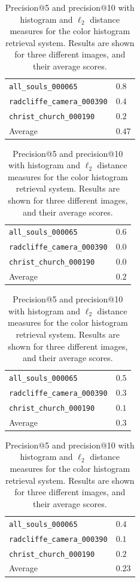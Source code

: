\documentclass[a4paper,10pt,twoside]{article}
\begin{document}
\begin{table}
  \begin{subtable}{0.47\textwidth}
    \begin{tabular}{l|l}
      \texttt{all\_souls\_000065} & $0.8$ \\
      \texttt{radcliffe\_camera\_000390} & $0.4$ \\
      \texttt{christ\_church\_000190} & $0.2$ \\
      \hline
      Average                     & $0.47$ \\
    \end{tabular}
    \caption{Precision@5, histogram distance.}
    \label{tab:color_p5h}
  \end{subtable}
  \hspace*{\fill}
  \begin{subtable}{0.47\textwidth}
    \begin{tabular}{l|l}
      \texttt{all\_souls\_000065} & $0.6$ \\
      \texttt{radcliffe\_camera\_000390} & $0.0$ \\
      \texttt{christ\_church\_000190} & $0.0$ \\
      \hline
      Average                     & $0.2$ \\
    \end{tabular}
    \caption{Precision@5, $\ell_2$ distance.}
    \label{tab:color_p5l}
  \end{subtable}
  \begin{subtable}{0.47\textwidth}
    \begin{tabular}{l|l}
      \texttt{all\_souls\_000065} & $0.5$ \\
      \texttt{radcliffe\_camera\_000390} & $0.3$ \\
      \texttt{christ\_church\_000190} & $0.1$ \\
      \hline
      Average                     & $0.3$ \\
    \end{tabular}
    \caption{Precision@10, histogram distance.}
    \label{tab:color_p10h}
  \end{subtable}
  \hspace*{\fill}
  \begin{subtable}{0.47\textwidth}
    \begin{tabular}{l|l}
      \texttt{all\_souls\_000065} & $0.4$ \\
      \texttt{radcliffe\_camera\_000390} & $0.1$ \\
      \texttt{christ\_church\_000190} & $0.2$ \\
      \hline
      Average                     & $0.23$ \\
    \end{tabular}
    \caption{Precision@10, $\ell_2$ distance.}
    \label{tab:color_p10l}
  \end{subtable}
  \caption{Precision@5 and precision@10 with histogram and $\ell_2$ distance measures for the color histogram retrieval system.  Results are shown for three different images, and their average scores.}
  \label{tab:color_precision}
\end{table}



\end{document}

